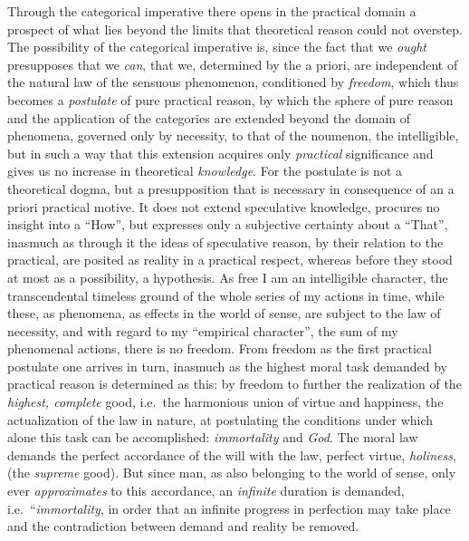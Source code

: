 Through the categorical imperative there opens in the practical domain a
prospect of what lies beyond the limits that theoretical reason could
not overstep. The possibility of the categorical imperative is, since
the fact that we \emph{ought} presupposes that we \emph{can}, that we,
determined by the a priori, are independent of the natural law of the
sensuous phenomenon, conditioned by \emph{freedom}, which thus becomes a
\emph{postulate} of pure practical reason, by which the sphere of pure
reason and the application of the categories are extended beyond the
domain of phenomena, governed only by necessity, to that of the
noumenon, the intelligible, but in such a way that this extension
acquires only \emph{practical} significance and gives us no increase in
theoretical \emph{knowledge}. For the postulate is not a theoretical
dogma, but a presupposition that is necessary in consequence of an a
priori practical motive.
It does not extend speculative knowledge, procures no insight into a
``How'', but expresses only a subjective certainty about a ``That'',
inasmuch as through it the ideas of speculative reason, by their
relation to the practical, are posited as reality in a practical
respect, whereas before they stood at most as a possibility, a
hypothesis. As free I am an intelligible character, the transcendental
timeless ground of the whole series of my actions in time,
while these, as phenomena, as effects in the world of sense, are subject
to the law of necessity, and with regard to my ``empirical character'',
the sum of my phenomenal actions, there is no freedom. From freedom as
the first practical postulate one arrives in turn, inasmuch as the
highest moral task demanded by practical reason is determined as this:
by freedom to further the realization of the \emph{highest, complete}
good, i.e.\ the harmonious union of virtue and happiness, the
actualization of the law in nature, at postulating the conditions under
which alone this task can be accomplished: \emph{immortality} and
\emph{God}. The moral law demands the perfect accordance of the will
with the law, perfect virtue, \emph{holiness}, (the \emph{supreme}
good). But since man, as also belonging to the world of sense, only ever
\emph{approximates} to this accordance, an \emph{infinite} duration is
demanded, i.e.\ ``\emph{immortality}, in order that an infinite progress
in perfection may take place and the contradiction between demand and
reality be removed.
